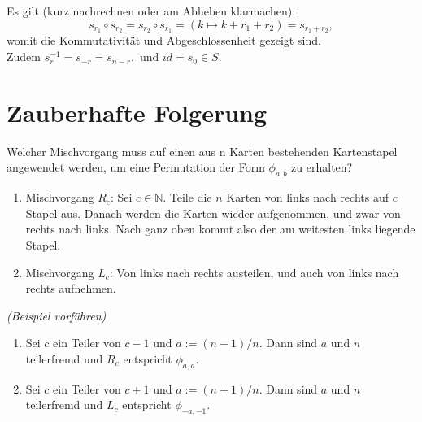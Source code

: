 \documentclass[a4paper]{article}
\begin{document}
    \begin{beweis}
        Es gilt (kurz nachrechnen oder am Abheben klarmachen):  
       \[
           s_{r_1} \circ s_{r_2} = s_{r_2} \circ s_{r_1} = (k \mapsto k + r_1 + r_2) = s_{r_1 + r_2}
       ,\] 
       womit die Kommutativität und Abgeschlossenheit gezeigt sind. \\
       Zudem $s_{r}^{-1} = s_{-r} = s_{n-r},$ und $id = s_0 \in S$.
    \end{beweis}

    \section{Zauberhafte Folgerung}
    Welcher Mischvorgang muss auf einen aus n Karten bestehenden Kartenstapel angewendet werden, um eine Permutation der Form $\phi_{a,b}$ zu erhalten? 
    \begin{enumerate}
    \item Mischvorgang $R_c$: Sei $c \in \mathbb{N}$. Teile die $n$ Karten von links nach rechts auf $c$ Stapel aus. Danach werden die Karten wieder aufgenommen, und zwar von rechts nach links. Nach ganz oben kommt also der am weitesten links liegende Stapel.
    \item Mischvorgang $L_c$: Von links nach rechts austeilen, und auch von links nach rechts aufnehmen.
    \end{enumerate}
    \textit{(Beispiel vorführen)}
    \begin{definition} 
    \begin{enumerate}
    \item Sei $c$ ein Teiler von $c - 1$ und $a := (n - 1)/n$. Dann sind $a$ und $n$ teilerfremd und $R_c$ entspricht $\phi_{a,a}$.
    \item Sei $c$ ein Teiler von $c + 1$ und $a := (n + 1)/n$. Dann sind $a$ und $n$ teilerfremd und $L_c$ entspricht $\phi_{-a,-1}$.
    \end{enumerate}
    \end{definition}
    \vspace{2mm}
\end{document}
